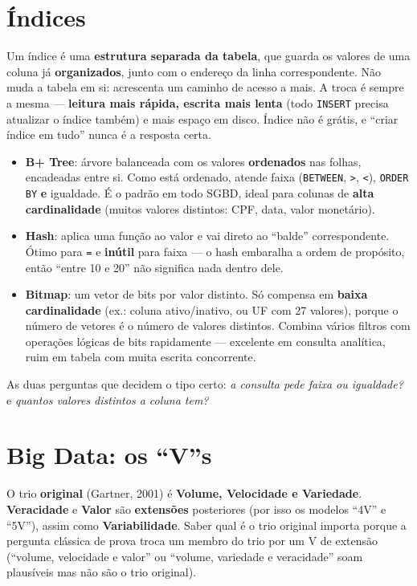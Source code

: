 \section{Índices}

\begin{conceito}
Um índice é uma \textbf{estrutura separada da tabela}, que guarda os
valores de uma coluna já \textbf{organizados}, junto com o endereço da
linha correspondente. Não muda a tabela em si: acrescenta um caminho de
acesso a mais. A troca é sempre a mesma --- \textbf{leitura mais rápida,
escrita mais lenta} (todo \texttt{INSERT} precisa atualizar o índice
também) e mais espaço em disco. Índice não é grátis, e “criar índice em
tudo” nunca é a resposta certa.

\begin{itemize}
\item \textbf{B+ Tree}: árvore balanceada com os valores \textbf{ordenados}
nas folhas, encadeadas entre si. Como está ordenado, atende faixa
(\texttt{BETWEEN}, \texttt{>}, \texttt{<}), \texttt{ORDER BY} \textbf{e}
igualdade. É o padrão em todo SGBD, ideal para colunas de \textbf{alta
cardinalidade} (muitos valores distintos: CPF, data, valor monetário).
\item \textbf{Hash}: aplica uma função ao valor e vai direto ao “balde”
correspondente. Ótimo para \texttt{=} e \textbf{inútil} para faixa --- o
hash embaralha a ordem de propósito, então “entre 10 e 20” não significa
nada dentro dele.
\item \textbf{Bitmap}: um vetor de bits por valor distinto. Só compensa em
\textbf{baixa cardinalidade} (ex.: coluna ativo/inativo, ou UF com 27
valores), porque o número de vetores é o número de valores distintos.
Combina vários filtros com operações lógicas de bits rapidamente ---
excelente em consulta analítica, ruim em tabela com muita escrita
concorrente.
\end{itemize}

As duas perguntas que decidem o tipo certo: \textit{a consulta pede faixa
ou igualdade?} e \textit{quantos valores distintos a coluna tem?}
\end{conceito}

\section{Big Data: os “V”s}

\begin{conceito}
O trio \textbf{original} (Gartner, 2001) é \textbf{Volume, Velocidade e
Variedade}. \textbf{Veracidade} e \textbf{Valor} são \textbf{extensões}
posteriores (por isso os modelos “4V” e “5V”), assim como
\textbf{Variabilidade}. Saber qual é o trio original importa porque a
pergunta clássica de prova troca um membro do trio por um V de extensão
(“volume, velocidade e valor” ou “volume, variedade e veracidade” soam
plausíveis mas não são o trio original).
\end{conceito}
